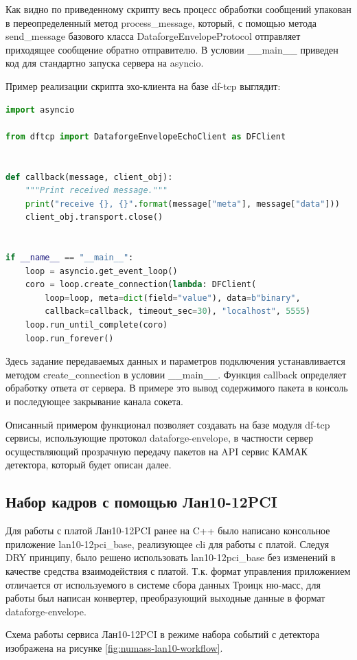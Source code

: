 \documentclass[a4paper,14pt]{extreport}
\begin{document}
Как видно по приведенному скрипту весь процесс обработки сообщений упакован в переопределенный метод process\_message, который, с помощью метода send\_message базового класса DataforgeEnvelopeProtocol отправляет приходящее сообщение обратно отправителю. В условии \_\_main\_\_ приведен код для стандартно запуска сервера на asyncio.

Пример реализации скрипта эхо-клиента на базе df-tcp выглядит:
\begin{lstlisting}[language=Python,style=protobuf]
import asyncio

from dftcp import DataforgeEnvelopeEchoClient as DFClient


def callback(message, client_obj):
    """Print received message."""
    print("receive {}, {}".format(message["meta"], message["data"]))
    client_obj.transport.close()


if __name__ == "__main__":
    loop = asyncio.get_event_loop()
    coro = loop.create_connection(lambda: DFClient(
        loop=loop, meta=dict(field="value"), data=b"binary",
        callback=callback, timeout_sec=30), "localhost", 5555)
    loop.run_until_complete(coro)
    loop.run_forever()
\end{lstlisting}

Здесь задание передаваемых данных и параметров подключения устанавливается методом create\_connection в условии \_\_main\_\_. Функция callback определяет обработку ответа от сервера. В примере это вывод содержимого пакета в консоль и последующее закрывание канала сокета.

Описанный примером функционал позволяет создавать на базе модуля df-tcp сервисы, использующие протокол dataforge-envelope, в частности сервер осуществляющий прозрачную передачу пакетов на API сервис КАМАК детектора, который будет описан далее.

\subsection{Набор кадров с помощью Лан10-12PCI}
Для работы с платой Лан10-12PCI ранее на C++ было написано консольное приложение lan10-12pci\_base, реализующее cli для работы с платой. Следуя DRY принципу, было решено использовать lan10-12pci\_base без изменений в качестве средства взаимодействия с платой. Т.к. формат управления приложением отличается от используемого в системе сбора данных Троицк ню-масс, для работы был написан конвертер, преобразующий выходные данные в формат dataforge-envelope. 

Схема работы сервиса Лан10-12PCI в режиме набора событий с детектора изображена на рисунке \ref{fig:numass-lan10-workflow}.
\end{document}
